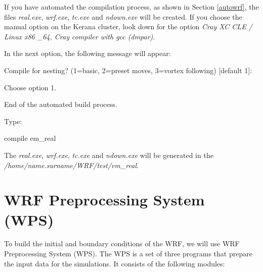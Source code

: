 \noindent If you have automated the compilation process, as shown in Section \textcolor{bleu_cite}{\ref{autowrf}}, the files \textit{real.exe}, \textit {wrf.exe},
\textit{tc.exe} and \textit{ndown.exe} will be created. If you choose the manual option on the Kerana cluster, look down for the option \textit{Cray XC CLE / Linux x86 \_64, Cray compiler with gcc (dmpar)}.
\bigskip

\noindent In the next option, the following message will appear:
\bigskip

\begin{bashcode}
Compile for nesting? (1=basic, 2=preset moves, 3=vortex following) [default 1]:
\end{bashcode}
\bigskip

\noindent Choose option 1.
\bigskip

\begin{tcolorbox}[enhanced,
  grow to left by=0cm,%
  grow to right by=0cm,%
  enlarge top by=0cm,%
  enlarge bottom by=0cm,%
  tcbox raise base,
  boxrule=1.0pt,
  left=18mm,
  colframe=red!50!black,coltext=red!25!black,colback=red!10!white,
  overlay={\begin{tcbclipinterior}\fill[red!75!blue!50!white] (frame.south west)
    rectangle node[text=white,font=\sffamily\bfseries\footnotesize,rotate=0] {WARNING} ([xshift=18mm]frame.north west);\end{tcbclipinterior}}]
End of the automated build process.
\end{tcolorbox}
\bigskip

\noindent Type:
\bigskip

\begin{bashcode}
compile em_real
\end{bashcode}
\bigskip

\noindent The \textit{real.exe}, \textit{wrf.exe}, \textit{tc.exe} and \textit{ndown.exe} will be generated in the \textit{/home/name.surname/WRF/test/em\_real}.
\bigskip

\section{WRF Preprocessing System (WPS)}\label{wpssecao}
\bigskip

\noindent To build the initial and boundary conditions of the WRF, we will use WRF Preprocessing System (WPS). The WPS is a set of three programs that 
prepare the input data for the simulations. It consists of the following modules:
\bigskip

